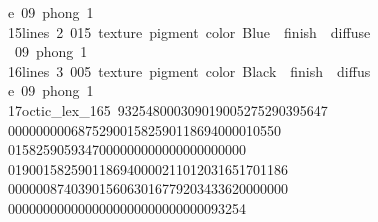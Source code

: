 \begin{tabbing}
\>e\ 09\ phong\ 1\ \\[0pt]
15\>\>\>lines\ 2\ 015\ texture\ pigment\ color\ Blue\ \ finish\ \ diffuse\\[0pt]
\>\ 09\ phong\ 1\ \\[0pt]
16\>\>\>lines\ 3\ 005\ texture\ pigment\ color\ Black\ \ finish\ \ diffus\\[0pt]
\>e\ 09\ phong\ 1\ \\[0pt]
17\>\>\>octic\_lex\_165\ 932548000309019005275290395647\\[0pt]
000000000687529001582590118694000010550\\[0pt]
0158259059347000000000000000000000\\[0pt]
0190015825901186940000211012031651701186\\[0pt]
0000008740390156063016779203433620000000\\[0pt]
\>0000000000000000000000000000093254\\[0pt]

\end{tabbing}
